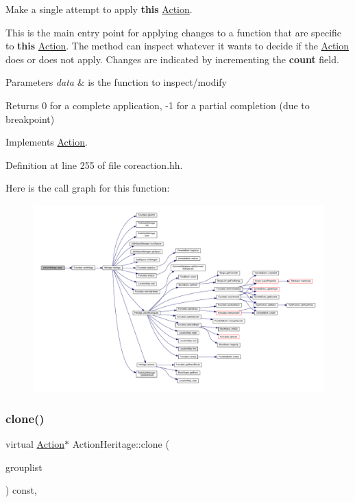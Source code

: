 Make a single attempt to apply {\bfseries{this}} \mbox{\hyperlink{class_action}{Action}}. 

This is the main entry point for applying changes to a function that are specific to {\bfseries{this}} \mbox{\hyperlink{class_action}{Action}}. The method can inspect whatever it wants to decide if the \mbox{\hyperlink{class_action}{Action}} does or does not apply. Changes are indicated by incrementing the {\bfseries{count}} field. 
\begin{DoxyParams}{Parameters}
{\em data} & is the function to inspect/modify \\
\hline
\end{DoxyParams}
\begin{DoxyReturn}{Returns}
0 for a complete application, -\/1 for a partial completion (due to breakpoint) 
\end{DoxyReturn}


Implements \mbox{\hyperlink{class_action_aac1c3999d6c685b15f5d9765a4d04173}{Action}}.



Definition at line 255 of file coreaction.\+hh.

Here is the call graph for this function\+:
\nopagebreak
\begin{figure}[H]
\begin{center}
\leavevmode
\includegraphics[width=350pt]{class_action_heritage_a10a113512ed64008b5c8fb54d4040843_cgraph}
\end{center}
\end{figure}
\mbox{\label{class_action_heritage_ac3da4f8c7eac163ec7c456dc6ed947fd}} 
\subsubsection{\texorpdfstring{clone()}{clone()}}
{\footnotesize\ttfamily virtual \mbox{\hyperlink{class_action}{Action}}$\ast$ Action\+Heritage\+::clone (\begin{DoxyParamCaption}\item[{const \mbox{\hyperlink{class_action_group_list}{Action\+Group\+List}} \&}]{grouplist }\end{DoxyParamCaption}) const\hspace{0.3cm}{\ttfamily [inline]}, {\ttfamily [virtual]}}



